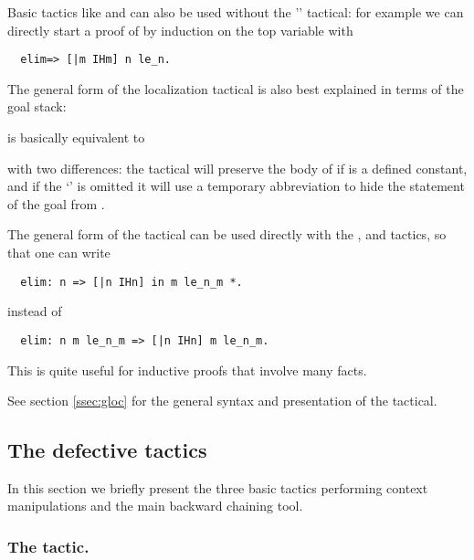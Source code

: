 Basic tactics like  and  can also be used without the
'\ssrC{:}' tactical: for example we can directly start a proof of 
by induction on the top variable  with
\begin{lstlisting}
  elim=> [|m IHm] n le_n.
\end{lstlisting}

\noindent
The general form of the localization tactical  is also best
explained in terms of the goal stack:

\begin{center}
  {\tac} 
\end{center}

is basically equivalent to

\begin{center}
   {\tac} 
\end{center}

with two differences: the  tactical will preserve the body of  if
 is a defined constant, and if the `\ssrC{*}' is omitted it
will use a temporary abbreviation to hide the statement of the goal
from .

The general form of the  tactical can be used directly with
the ,  and  tactics, so that one can write
\begin{lstlisting}
  elim: n => [|n IHn] in m le_n_m *.
\end{lstlisting}
instead of
\begin{lstlisting}
  elim: n m le_n_m => [|n IHn] m le_n_m.
\end{lstlisting}
This is quite useful for inductive proofs that involve many facts.

\noindent See section \ref{ssec:gloc} for the general syntax and presentation
of the  tactical.

\subsection{The defective tactics}\label{ssec:basictac}

In this section we briefly present the three basic tactics performing
context manipulations and the main backward chaining tool.

\subsubsection*{The  tactic.}\label{sssec:move}

